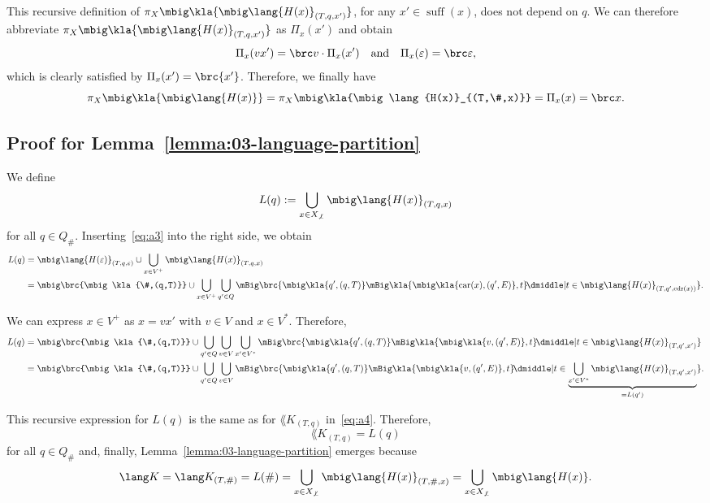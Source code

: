This recursive definition of $\pi_X\mbig\kla{\mbig\lang{H(x)}_{(T,q,x')}}$, for
any $x'\in\operatorname{suff}(x)$, does not depend on $q$. We can therefore
abbreviate $\pi_X\mbig\kla{\mbig\lang{H(x)}_{(T,q,x')}}$ as $\Pi_x(x')$ and
obtain
\[
 \Pi_x(vx') = \brc v \cdot \Pi_x(x')
 \quad\text{and}\quad
 \Pi_x(\eps) = \brc\eps,
\]
which is clearly satisfied by $\Pi_x(x') = \brc{x'}$. Therefore, we finally have
\[
 \pi_X\mbig\kla{\mbig\lang{H(x)}} = \pi_X\mbig\kla{\mbig\lang{H(x)}_{(T,\#,x)}} = \Pi_x(x) = \brc x.
\]

\subsection{Proof for Lemma~\ref{lemma:03-language-partition}}

We define
\[
 L(q) := \bigcup_{x\in X_{\not\bot}} \mbig\lang{H(x)}_{(T,q,x)}
\]
for all $q\in Q_\#$. Inserting~\eqref{eq:a3} into the right side, we obtain
\begin{align*}
 L(q)
 &= \mbig\lang{H(\eps)}_{(T,q,\eps)} \cup \bigcup_{x\in V^+} \mbig\lang{H(x)}_{(T,q,x)} \\
 &= \mbig\brc{\mbig\kla{\#,(q,T)}} \cup \bigcup_{x\in V^+} \bigcup_{q'\in Q}\mBig\brc{\mbig\kla{q',(q,T)}\mBig\kla{\mbig\kla{\car(x),(q',E)},t} \!\dmiddle| t\in\mbig\lang{H(x)}_{(T,q',\cdr(x))}}.
\end{align*}

We can express $x\in V^+$ as $x = vx'$ with $v\in V$ and $x\in V^*$. Therefore,
\begin{align*}
 L(q)
 &= \mbig\brc{\mbig\kla{\#,(q,T)}} \cup \bigcup_{q'\in Q} \bigcup_{v\in V} \bigcup_{x'\in V^*} \mBig\brc{\mbig\kla{q',(q,T)}\mBig\kla{\mbig\kla{v,(q',E)},t} \!\dmiddle| t\in\mbig\lang{H(x)}_{(T,q',x')}} \\
 &= \mbig\brc{\mbig\kla{\#,(q,T)}} \cup \bigcup_{q'\in Q} \bigcup_{v\in V} \mBig\brc{\mbig\kla{q',(q,T)}\mBig\kla{\mbig\kla{v,(q',E)},t} \!\dmiddle| t\in\underbrace{\bigcup_{x'\in V^*} \mbig\lang{H(x)}_{(T,q',x')}}_{=L(q')}}.
\end{align*}

This recursive expression for $L(q)$ is the same as for $\lang K_{(T,q)}$ in~\eqref{eq:a4}. Therefore,
\[
 \lang K_{(T,q)} = L(q)
\]
for all $q\in Q_\#$ and, finally, Lemma~\ref{lemma:03-language-partition} emerges because
\[
 \lang K = \lang K_{(T,\#)} = L(\#)
 = \bigcup_{x\in X_{\not\bot}} \mbig\lang{H(x)}_{(T,\#,x)}
 = \bigcup_{x\in X_{\not\bot}} \mbig\lang{H(x)}.
\]
